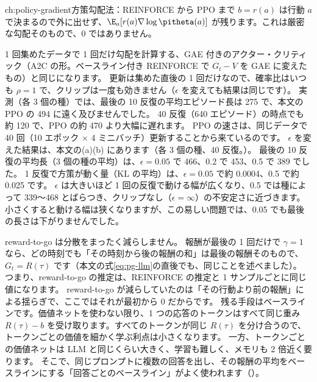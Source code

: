 \begin{answers}{ch:policy-gradient}{方策勾配法：REINFORCE から PPO まで}
$b=r(a)$ は行動 $a$ で決まるので外に出せず、$\E_a[r(a)\nabla\log\pitheta(a)]$ が残ります。これは厳密な勾配そのもので、0 ではありません。
\item 1 回集めたデータで 1 回だけ勾配を計算する、GAE 付きのアクター・クリティック（A2C の形。ベースライン付き REINFORCE で $G_t-V$ を GAE に変えたもの）と同じになります。
更新は集めた直後の 1 回だけなので、確率比はいつも $\rho=1$ で、クリップは一度も効きません（$\epsilon$ を変えても結果は同じです）。
実測（各 3 個の種）では、最後の 10 反復の平均エピソード長は 275 で、本文の PPO の 494 に遠く及びませんでした。
40 反復（640 エピソード）の時点でも約 120 で、PPO の約 470 より大幅に遅れます。
PPO の速さは、同じデータで 40 回（10 エポック × 4 ミニバッチ）更新することから来ているのです。
$\epsilon$ を変えた結果は、本文の(a)(b) にあります（各 3 個の種、40 反復。）。
最後の 10 反復の平均長（3 個の種の平均）は、$\epsilon=0.05$ で 466、0.2 で 453、0.5 で 389 でした。
1 反復で方策が動く量（KL の平均）は、$\epsilon=0.05$ で約 0.0004、0.5 で約 0.025 です。
$\epsilon$ は大きいほど 1 回の反復で動ける幅が広くなり、0.5 では種によって 339〜468 とばらつき、クリップなし（$\epsilon=\infty$）の不安定さに近づきます。
小さくすると動ける幅は狭くなりますが、この易しい問題では、0.05 でも最後の長さは下がりませんでした。

\item reward-to-go は分散をまったく減らしません。
報酬が最後の 1 回だけで $\gamma=1$ なら、どの時刻でも「その時刻から後の報酬の和」は最後の報酬そのもので、$G_t=R(\tau)$ です（本文の式\eqref{eq:pg-llm}の直後でも、同じことを述べました）。
つまり、reward-to-go の推定は、REINFORCE の推定と 1 サンプルごとに同じ値になります。
reward-to-go が減らしていたのは「その行動より前の報酬」による揺らぎで、ここではそれが最初から 0 だからです。
残る手段はベースラインです。価値ネットを使わない限り、1 つの応答のトークンはすべて同じ重み $R(\tau)-b$ を受け取ります。すべてのトークンが同じ $R(\tau)$ を分け合うので、トークンごとの価値を細かく学ぶ利点は小さくなります。
一方、トークンごとの価値ネットは LLM と同じくらい大きく、学習も難しく、メモリも 2 倍近く要ります。
そこで、同じプロンプトに複数の回答を出し、その報酬の平均をベースラインにする「回答ごとのベースライン」がよく使われます（）。
\end{answers}
